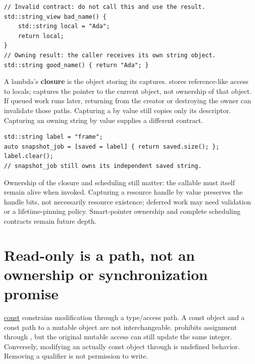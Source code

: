 \begin{verbatim}
// Invalid contract: do not call this and use the result.
std::string_view bad_name() {
    std::string local = "Ada";
    return local;
}
// Owning result: the caller receives its own string object.
std::string good_name() { return "Ada"; }
\end{verbatim}

A lambda's \textbf{closure} is the object storing its captures. \BookInlineCode{{{[}}{\&}{{]}}}{{[}\&{]}} stores reference-like access to locals; \BookInlineCode{{{[}}{t}{h}{i}{s}{{]}}}{{[}this{]}} captures the pointer to the current object, not ownership of that object. If queued work runs later, returning from the creator or destroying the owner can invalidate those paths. Capturing a  by value still copies only its descriptor. Capturing an owning string by value supplies a different contract.

\begin{verbatim}
std::string label = "frame";
auto snapshot_job = [saved = label] { return saved.size(); };
label.clear();
// snapshot_job still owns its independent saved string.
\end{verbatim}

Ownership of the closure and scheduling still matter: the callable must itself remain alive when invoked. Capturing a resource handle by value preserves the handle bits, not necessarily resource existence; deferred work may need validation or a lifetime-pinning policy. Smart-pointer ownership and complete scheduling contracts remain future depth.

\section{Read-only is a path, not an ownership or synchronization promise}\label{01-foundations-i-ch003-read-only-is-a-path-not-an-ownership-or-synchronization-promise}

\hypertarget{01-foundations-i-ch003-read-only-is-a-path-not-an-ownership-or-synchronization-promise}{}

\hyperref[appendix-c25d60fed375]{const} constrains modification through a type/access path. A const object and a const path to a mutable object are not interchangeable.  prohibits assignment through , but the original mutable access can still update the same integer. Conversely, modifying an actually const object through  is undefined behavior. Removing a qualifier is not permission to write.

